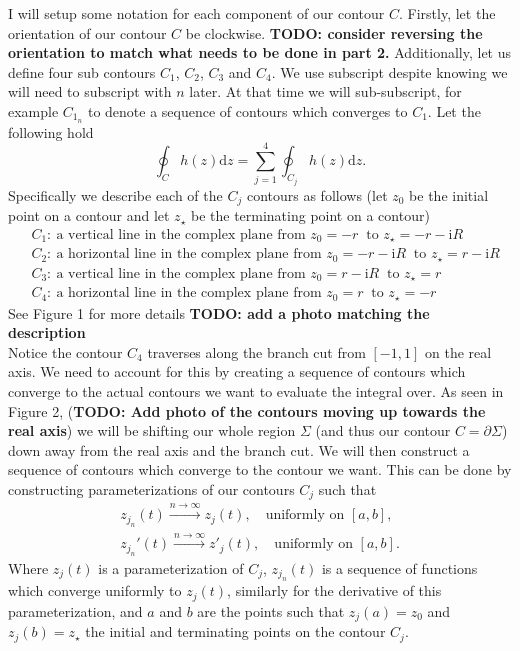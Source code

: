 \documentclass[10pt]{amsart}
\newcommand{\D}{\mathrm{d}}
\newcommand{\I}{\mathrm{i}}
\theoremstyle{nonumberplain}
\begin{document}
\begin{enumerate}[label={\bf {\arabic*}:}]
\begin{itemize}
\noindent
I will setup some notation for each component of our contour $C$.
Firstly, let the orientation of our contour $C$ be clockwise. \textbf{TODO: consider reversing the orientation to match what needs to be done in part 2.}
Additionally, let us define four sub contours $C_1$, $C_2$, $C_3$ and $C_4$.
We use subscript despite knowing we will need to subscript with $n$ later.
At that time we will sub-subscript, for example $C_{1_n}$ to denote a sequence of contours which converges to $C_1$.
Let the following hold
$$\oint_C h(z) \D z = \sum_{j = 1}^{4} \oint_{C_j}h(z) \D z.$$
Specifically we describe each of the $C_j$ contours as follows (let $z_0$ be the initial point on a contour and let $z_{\star}$ be the terminating point on a contour)
\begin{align*}
&C_1: \: \text{a vertical line in the complex plane from } z_0=-r \: \text{ to }  z_{\star}=-r-\I R \\
&C_2: \: \text{a horizontal line in the complex plane from } z_0=-r-\I R \: \text{ to }  z_{\star}=r-\I R \\
&C_3: \: \text{a vertical line in the complex plane from } z_0=r-\I R \: \text{ to }  z_{\star}=r \\
&C_4: \: \text{a horizontal line in the complex plane from } z_0=r \: \text{ to }  z_{\star}=-r
\end{align*}
See Figure 1 for more details \textbf{TODO: add a photo matching the description}
\\

Notice the contour $C_4$ traverses along the branch cut from $[-1, 1]$ on the real axis.
We need to account for this by creating a sequence of contours which converge to the actual contours we want to evaluate the integral over.
As seen in Figure 2, (\textbf{TODO: Add photo of the contours moving up towards the real axis}) we will be shifting our whole region $\Sigma$ (and thus our contour $C = \partial \Sigma$) down away from the real axis and the branch cut.
We will then construct a sequence of contours which converge to the contour we want.
This can be done by constructing parameterizations of our contours $C_j$ such that 
\begin{align*}
	z_{j_n}(t) \overset{n \to \infty}{\longrightarrow} z_j(t),  \quad \text{uniformly on } [a,b],\\
        z_{j_n}'(t) \overset{n \to \infty}{\longrightarrow} z'_j(t), \quad \text{uniformly on } [a,b].
\end{align*}
Where $z_j(t)$ is a parameterization of $C_j$, $z_{j_n}(t)$ is a sequence of functions which converge uniformly to $z_j(t)$, similarly for the derivative of this parameterization, and $a$ and $b$ are the points such that $z_j(a) = z_0$ and $z_j(b) = z_{\star}$ the initial and terminating points on the contour $C_j$. \\


\end{itemize}
\end{enumerate}
\end{document}
